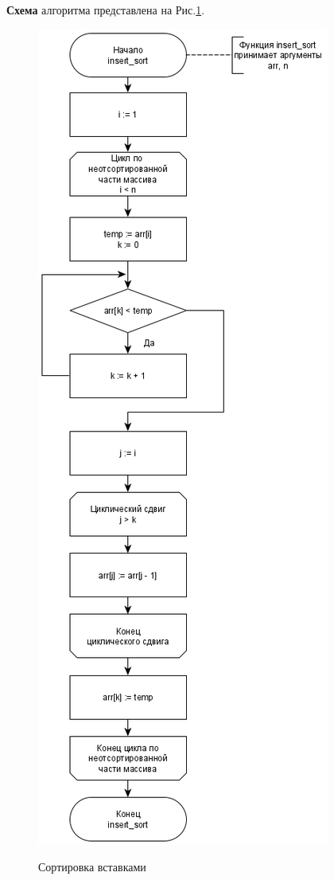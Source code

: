 \textbf{Схема} алгоритма представлена на Рис.\ref{fig2:image}.
\begin{figure}[h]
	\begin{center}
		{\includegraphics[scale = 0.57]{schemes/insert}}
		\caption{Сортировка вставками}
		\label{fig2:image}
	\end{center}
\end{figure}

